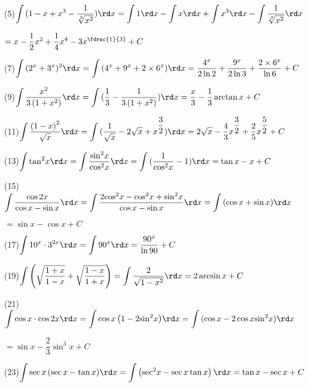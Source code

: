 (5)$\displaystyle\int {(1 - x + {x^3} - \dfrac{1}{{\sqrt[3]{{{x^2}}}}}} )\rd x = \displaystyle\int {1\rd x}  - \displaystyle\int {x\rd x + \displaystyle\int {{x^3}\rd x - \displaystyle\int {\dfrac{1}{{\sqrt[3]{{{x^2}}}}}\rd x} } } $

$ = x - \dfrac{1}{2}{x^2} + \dfrac{1}{4}{x^4} - 3{x^{\fdrac{1}{3}}} + C$

(7)$\displaystyle\int {({2^x} + {3^x}} {)^2}\rd x = \displaystyle\int {({4^x} + {9^x} + 2 \times {6^x}} )\rd x = \dfrac{{{4^x}}}{{2\ln 2}} + \dfrac{{{9^x}}}{{2\ln 3}} + \dfrac{{2 \times {6^x}}}{{\ln 6}} + C$

(9)$\displaystyle\int {\dfrac{{{x^2}}}{{3\left( {1 + {x^2}} \right)}}} \rd x = \displaystyle\int {(\dfrac{1}{3}}  - \dfrac{1}{{3\left( {1 + {x^2}} \right)}})\rd x = \dfrac{x}{3} - \dfrac{1}{3}\arctan x + C$

(11)$\displaystyle\int {\dfrac{{{{(1 - x)}^2}}}{{\sqrt x }}\rd x}  = \displaystyle\int {(\dfrac{1}{{\sqrt x }} - 2\sqrt x  + {x^{\dfrac{3}{2}}})\rd x}  = 2\sqrt x  - \dfrac{4}{3}{x^{\dfrac{3}{2}}} + \dfrac{2}{5}{x^{\dfrac{5}{2}}} + C$

(13)$\displaystyle\int {{{\tan }^2}x\rd x}  = \displaystyle\int {\dfrac{{{{\sin }^2}x}}{{{{\cos }^2}x}}} \rd x = \displaystyle\int {(\dfrac{1}{{{{\cos }^2}x}}}  - 1)\rd x = \tan x - x + C$

(15)$\displaystyle\int {\dfrac{{\cos 2x}}{{\cos x - \sin x}}} \rd x = \displaystyle\int {\dfrac{{2{{\cos }^2}x - {{\cos }^2}x + {{\sin }^2}x}}{{\cos x - \sin x}}} \rd x = \displaystyle\int {(\cos x + \sin x)\rd x} $

$ = \sin x - \cos x + C$

(17)$\displaystyle\int {{{10}^x} \cdot {3^{2x}}\rd x}  = \displaystyle\int {{{90}^x}\rd x}  = \dfrac{{{{90}^x}}}{{\ln 90}} + C$

(19)$\displaystyle\int {\left( {\sqrt {\dfrac{{1 + x}}{{1 - x}}}  + \sqrt {\dfrac{{1 - x}}{{1 + x}}} } \right)}  = \displaystyle\int {\dfrac{2}{{\sqrt {1 - {x^2}} }}} \rd x = 2\arcsin x + C$

(21)$\displaystyle\int {\cos x \cdot \cos 2x\rd x = \displaystyle\int {\cos x\left( {1 - 2{{\sin }^2}x} \right)} } \rd x = \displaystyle\int {(\cos x}  - 2\cos x{\sin ^2}x)\rd x$

$ = \sin x - \dfrac{2}{3}{\sin ^3}x + C$

(23)$\displaystyle\int {\sec x\left( {\sec x - \tan x} \right)} \rd x = \displaystyle\int {\left( {{{\sec }^2}x - \sec x\tan x} \right)\rd x}  = \tan x - \sec x + C$

